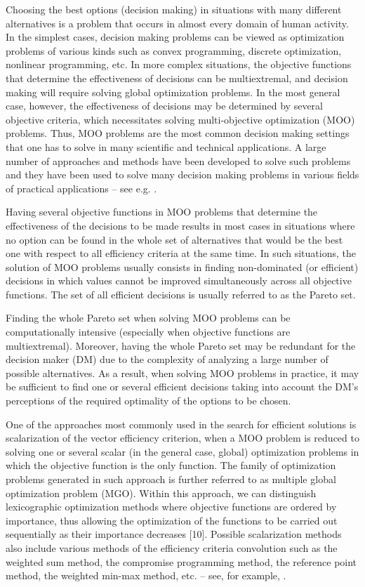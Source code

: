 \documentclass[runningheads]{llncs}
\begin{document}
Choosing the best options (decision making) in situations with many different alternatives is a problem that occurs in almost every domain of human activity. In the simplest cases, decision making problems can be viewed as optimization problems of various kinds such as convex programming, discrete optimization, nonlinear programming, etc. In more complex situations, the objective functions that determine the effectiveness of decisions can be multiextremal, and decision making will require solving global optimization problems. In the most general case, however, the effectiveness of decisions may be determined by several objective criteria, which necessitates solving multi-objective optimization (MOO) problems. Thus, MOO problems are the most common decision making settings that one has to solve in many scientific and technical applications. A large number of approaches and methods have been developed to solve such problems and they have been used to solve many decision making problems in various fields of practical applications -- see e.g. \cite{c1,c2,c3,c4,c5,c6,c7,c8,c9}.

Having several objective functions in MOO problems that determine the effectiveness of the decisions to be made results in most cases in situations where no option can be found in the whole set of alternatives that would be the best one with respect to all efficiency criteria at the same time. In such situations, the solution of MOO problems usually consists in finding non-dominated (or efficient) decisions in which values cannot be improved simultaneously across all objective functions. The set of all efficient decisions is usually referred to as the Pareto set.

Finding the whole Pareto set when solving MOO problems can be computationally intensive (especially when objective functions are multiextremal). Moreover, having the whole Pareto set may be redundant for the decision maker (DM) due to the complexity of analyzing a large number of possible alternatives. As a result, when solving MOO problems in practice, it may be sufficient to find one or several efficient decisions taking into account the DM's perceptions of the required optimality of the options to be chosen.

One of the approaches most commonly used in the search for efficient solutions is scalarization of the vector efficiency criterion, when a MOO problem is reduced to solving one or several scalar (in the general case, global) optimization problems in which the objective function is the only function. The family of optimization problems generated in such approach is further referred to as multiple global optimization problem (MGO). Within this approach, we can distinguish lexicographic optimization methods where objective functions are ordered by importance, thus  allowing the optimization of the functions to be carried out sequentially as their importance decreases [10]. Possible scalarization methods also include various methods of the efficiency criteria convolution such as the weighted sum method, the compromise programming method, the reference point method, the weighted min-max method, etc. -- see, for example, \cite{c2,c11,c12}. 
\end{document}
